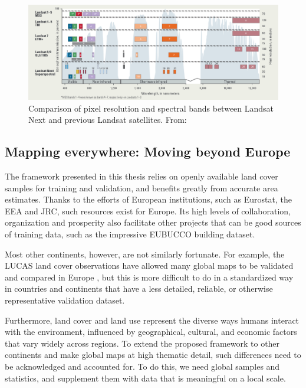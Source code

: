             \begin{figure}
            \centering
            \includegraphics[width=1\linewidth]{figs_06/landsat_next.png}
            \caption{Comparison of pixel resolution and spectral bands between Landsat Next and previous Landsat satellites. From: \citep{USGS2024LandsatNext}}
            \label{fig:landsat_next}
            \end{figure}
        
    \subsection{Mapping everywhere: Moving beyond Europe}
    \label{syn:everywhere}

        The framework presented in this thesis relies on openly available land cover samples for training and validation, and benefits greatly from accurate area estimates. Thanks to the efforts of European institutions, such as Eurostat, the EEA and JRC, such resources exist for Europe. Its high levels of collaboration, organization and prosperity also facilitate other projects that can be good sources of training data, such as the impressive EUBUCCO \citep{milojevic2023eubucco} building dataset.
        
        Most other continents, however, are not similarly fortunate. For example, the LUCAS land cover observations \citep{dandrimont2020harmonised} have allowed many global maps to be validated and compared in Europe \citep{gao2020consistency,venter2022global}, but this is more difficult to do in a standardized way in countries and continents that have a less detailed, reliable, or otherwise representative validation dataset.

        Furthermore, land cover and land use represent the diverse ways humans interact with the environment, influenced by geographical, cultural, and economic factors that vary widely across regions. To extend the proposed framework to other continents and make global maps at high thematic detail, such differences need to be acknowledged and accounted for. To do this, we need global samples and statistics, and supplement them with data that is meaningful on a local scale.

